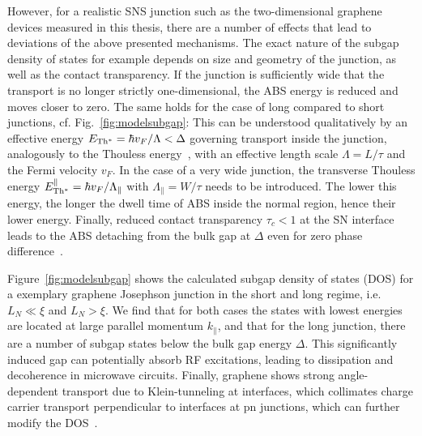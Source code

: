 However, for a realistic SNS junction such as the two-dimensional graphene devices measured in this thesis, there are a number of effects that lead to deviations of the above presented mechanisms.
%
The exact nature of the subgap density of states for example depends on size and geometry of the junction, as well as the contact transparency.
%
If the junction is sufficiently wide that the transport is no longer strictly one-dimensional, the ABS energy is reduced and moves closer to zero.
%
The same holds for the case of long compared to short junctions, cf. Fig.~\ref{fig:modelsubgap}:
%
This can be understood qualitatively by an effective energy $E_{\rm Th^*}=\hbar v_F/\Lambda<\Delta$ governing transport inside the junction, analogously to the Thouless energy~\cite{benshalomQuantumOscillationsCritical2015,schmidtBallisticGrapheneSuperconducting2018}, with an effective length scale $\Lambda=L/\tau$ and the Fermi velocity $v_F$.
%
In the case of a very wide junction, the transverse Thouless energy $E_{\rm Th^*}^\parallel=\hbar v_F/\Lambda_\parallel$ with $\Lambda_\parallel=W/\tau$ needs to be introduced.
%
The lower this energy, the longer the dwell time of ABS inside the normal region, hence their lower energy.
%
Finally, reduced contact transparency $\tau_c<1$ at the SN interface leads to the ABS detaching from the bulk gap at $\Delta$ even for zero phase difference~\cite{bretheauTunnellingSpectroscopyAndreev2017a}.


Figure~\ref{fig:modelsubgap} shows the calculated subgap density of states (DOS) for a exemplary graphene Josephson junction in the short and long regime, i.e. $L_N\ll\xi$ and $L_N>\xi$.
%
We find that for both cases the states with lowest energies are located at large parallel momentum $k_\parallel$, and that for the long junction, there are a number of subgap states below the bulk gap energy $\Delta$.
%
This significantly induced gap can potentially absorb RF excitations, leading to dissipation and decoherence in microwave circuits.
%
Finally, graphene shows strong angle-dependent transport due to Klein-tunneling at interfaces, which collimates charge carrier transport perpendicular to interfaces at pn junctions, which can further modify the DOS~\cite{beenakkerColloquiumAndreevReflection2008}.

